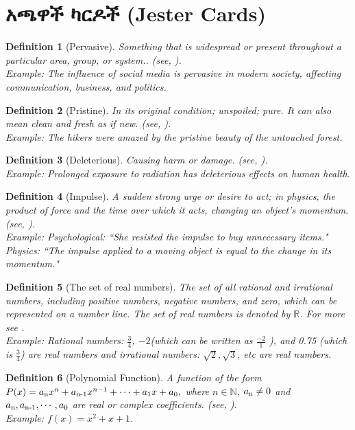 \documentclass[a4paper,12pt]{article}
\newenvironment{geez}{\geezfont}{}
\theoremstyle{mystyle}
\newtheorem{definition}{Definition}
\numberwithin{equation}{section}
\numberwithin{theorem}{section}
\numberwithin{proposition}{section}
\numberwithin{example}{section}
\numberwithin{remark}{section}
\numberwithin{lemma}{section}
\numberwithin{corollary}{section}
\numberwithin{definition}{section}
\numberwithin{amharicdefinition}{section}
\begin{document}
\section{\begin{geez}አጫዋች ካርዶች (Jester Cards)\end{geez}}
\label{S:2}
\begin{definition}[Pervasive] Something that is widespread or present throughout a particular area, group, or system.. (see, \cite{dictionary2002merriam}).\\
Example: The influence of social media is pervasive in modern society, affecting communication, business, and politics.
\end{definition}
\begin{definition}[Pristine] In its original condition; unspoiled; pure. It can also mean clean and fresh as if new.  (see,  \cite{dictionary1989oxford}).\\
Example: The hikers were amazed by the pristine beauty of the untouched forest.
\end{definition}
\begin{definition}[Deleterious] Causing harm or damage. (see, \cite{dictionary2002merriam}).\\
Example: Prolonged exposure to radiation has deleterious effects on human health.
\end{definition}
\begin{definition}[Impulse] A sudden strong urge or desire to act; in physics, the product of force and the time over which it acts, changing an object's momentum. (see, \cite{serway2018current}).\\
Example: Psychological: ``She resisted the impulse to buy unnecessary items."
Physics: ``The impulse applied to a moving object is equal to the change in its momentum."
\end{definition}
\begin{definition}[The set of real numbers] The set of all rational and irrational numbers, including positive numbers, negative numbers, and zero, which can be represented on a number line. The set of real numbers is denoted by $\mathbb{R}$. For more see \cite{rudin2021principles}.\\
Example: Rational numbers: $\frac{3}{4}$, $-2$(which can be written as $\frac{-2}{1}$ ), and 0.75 (which is  $\frac{3}{4}$) are real numbers and irrational numbers: $\sqrt{2},\sqrt{3}$, etc are real numbers.
\end{definition}
\begin{definition}[Polynomial Function] A function of the form
$P(x)=a\textsubscript {n}x^n+a\textsubscript {n-1}x^{n-1}+\cdots+a\textsubscript {1}x+a\textsubscript {0},$ where $n\in \mathbb{N}$, $a\textsubscript {n}\ne 0$ and $a\textsubscript {n},a\textsubscript {n-1},\cdots, a\textsubscript {0}$ are real or complex coefficients.  (see, \cite{lang1987linear}).\\
Example: $f(x)=x^2+x+1$.
\end{definition}
\end{document}
